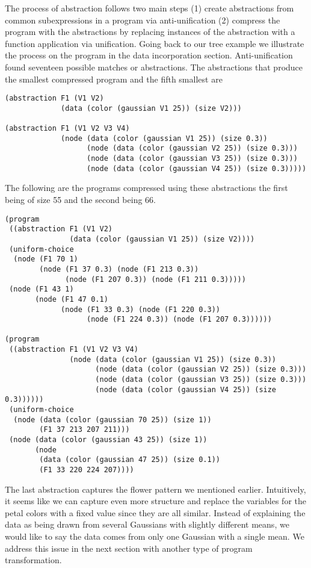\documentclass[a4paper,10pt]{article}
\begin{document}
The process of abstraction follows two main steps (1) create abstractions from common subexpressions in a program via anti-unification (2) compress the program with the abstractions by replacing instances of the abstraction with a function application via unification.  Going back to our tree example we illustrate the process on the program in the data incorporation section.
Anti-unification found seventeen possible matches or abstractions.  The abstractions that produce the smallest compressed program and the fifth smallest are 
\begin{lstlisting}
(abstraction F1 (V1 V2)
             (data (color (gaussian V1 25)) (size V2)))

(abstraction F1 (V1 V2 V3 V4)
             (node (data (color (gaussian V1 25)) (size 0.3))
                   (node (data (color (gaussian V2 25)) (size 0.3)))
                   (node (data (color (gaussian V3 25)) (size 0.3)))
                   (node (data (color (gaussian V4 25)) (size 0.3)))))
\end{lstlisting}
The following are the programs compressed using these abstractions the first being of size 55 and the second being 66.
\begin{lstlisting}
(program
 ((abstraction F1 (V1 V2)
               (data (color (gaussian V1 25)) (size V2))))
 (uniform-choice
  (node (F1 70 1)
        (node (F1 37 0.3) (node (F1 213 0.3))
              (node (F1 207 0.3)) (node (F1 211 0.3)))))
 (node (F1 43 1)
       (node (F1 47 0.1)
             (node (F1 33 0.3) (node (F1 220 0.3))
                   (node (F1 224 0.3)) (node (F1 207 0.3))))))

(program
 ((abstraction F1 (V1 V2 V3 V4)
               (node (data (color (gaussian V1 25)) (size 0.3))
                     (node (data (color (gaussian V2 25)) (size 0.3)))
                     (node (data (color (gaussian V3 25)) (size 0.3)))
                     (node (data (color (gaussian V4 25)) (size 0.3))))))
 (uniform-choice
  (node (data (color (gaussian 70 25)) (size 1))
        (F1 37 213 207 211)))
 (node (data (color (gaussian 43 25)) (size 1))
       (node
        (data (color (gaussian 47 25)) (size 0.1))
        (F1 33 220 224 207))))
\end{lstlisting}
The last abstraction captures the flower pattern we mentioned earlier.  Intuitively, it seems like we can capture even more structure and replace the variables for the petal colors with a fixed value since they are all similar.  Instead of explaining the data as being drawn from several Gaussians with slightly different means, we would like to say the data comes from only one Gaussian with a single mean.  We address this issue in the next section with another type of program transformation.
\end{document}

